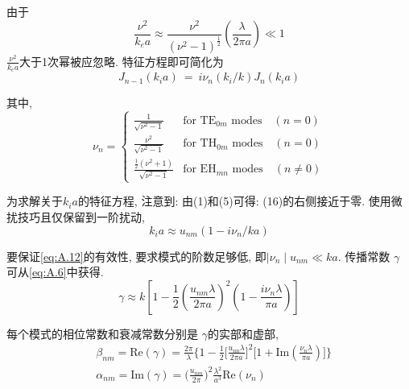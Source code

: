 \documentclass[14pt,a4paper,oneside]{article}
\numberwithin{equation}{subsection}             %
\numberwithin{figure}{subsection}               %
\begin{document}
由于
\begin{equation}
    \frac{\nu^2}{k_ea}\approx\frac{\nu^2}{(\nu^2-1)^{\frac12}}\left(\frac\lambda{2\pi a}\right)\ll1
    \label{eq:A.10}
\end{equation}
$\frac{\nu^2}{k_ea}$大于1次幂被应忽略. 特征方程即可简化为
\begin{equation}
    J_{n-1}(k_ia)\:=\:i\nu_n(k_i/k)J_n(k_ia)
    \label{eq:A.11}
\end{equation}

其中,
\begin{equation}
    \nu_n=\begin{cases}
        \frac1{\sqrt{\nu^2-1}}&\text{for TE}_{0m}\text{ modes}\quad(n=0)\\
        \frac{\nu^2}{\sqrt{\nu^2-1}}&\text{for TH}_{0m}\text{ modes}\quad(n=0)\\
        \frac{\frac12(\nu^2+1)}{\sqrt{\nu^2-1}}&\text{for EH}_{mn}\text{ modes}\quad(n\neq0)\end{cases}
    \label{eq:A.12}
\end{equation}

为求解关于$k_ia$的特征方程, 注意到: 由(1)和(5)可得: (16)的右侧接近于零. 使用微扰技巧且仅保留到一阶扰动, 
\begin{equation}
    k_ia\approx u_{nm}(1-i\nu_n/ka)
    \label{eq:A.13}
\end{equation}

要保证\ref{eq:A.12}的有效性, 要求模式的阶数足够低, 即$\mid\nu_n\mid u_{nm}\ll ka$. 传播常数 $\gamma$ 可从\ref{eq:A.6}中获得. 
\begin{equation}
    \gamma\approx k\left[1-\frac12\left(\frac{u_{nm}\lambda}{2\pi a}\right)^2\left(1-\frac{i\nu_n\lambda}{\pi a}\right)\right]
    \label{eq:A.14}
\end{equation}

每个模式的相位常数和衰减常数分别是 $\gamma$的实部和虚部, 
\begin{equation}
    \begin{aligned}
        &\beta_{nm}=\mathrm{Re}(\gamma)=\frac{2\pi}\lambda\biggr\{1-\frac12\biggl[\frac{u_{nn}\lambda}{2\pi a}\biggr]^2\biggl[1+\mathrm{Im}\left(\frac{\nu_n\lambda}{\pi a}\right)\biggr]\biggr\}\\
        &\alpha_{nm}=\mathrm{Im}(\gamma)=\biggl(\frac{u_{nm}}{2\pi}\biggr)^2\frac{\lambda^2}{a^3}\mathrm{Re}(\nu_n)
    \end{aligned}
    \label{eq:A.15}
\end{equation}
\end{document}
